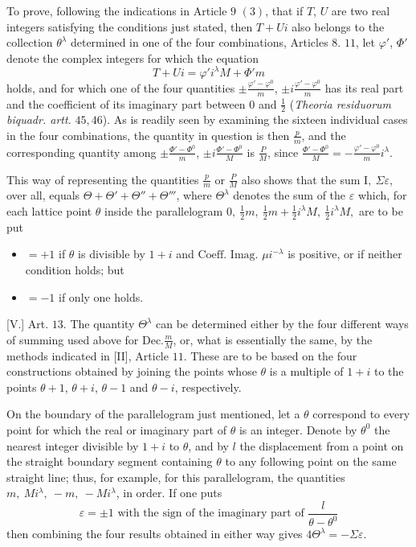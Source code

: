 To prove, following the indications in Article $9$ $(3)$, that if $T$, $U$ are two real integers satisfying the conditions just stated, then $T+Ui$ also belongs to the collection $\theta^\lambda$ determined in one of the four combinations, Articles $8$. $11$, let $\varphi'$, $\Phi'$ denote the complex integers for which the equation
\[
T+Ui=\varphi'i^\lambda M+\Phi'm
\]
holds, and for which one of the four quantities $\pm\frac{\varphi'-\varphi^0}{m}$, $\pm i\frac{\varphi'-\varphi^0}{m}$ has its real part and the coefficient of its imaginary part between $0$ and $\tfrac12$ (\textit{Theoria residuorum biquadr. artt.} $45,46$). As is readily seen by examining the sixteen individual cases in the four combinations, the quantity in question is then $\frac pm$, and the corresponding quantity among $\pm\frac{\Phi'-\Phi^0}{m}$, $\pm i\frac{\Phi'-\Phi^0}{M}$ is $\frac PM$, since $\frac{\Phi'-\Phi^0}{M}=-\frac{\varphi'-\varphi^0}{m}i^\lambda$.

This way of representing the quantities $\frac pm$ or $\frac PM$ also shows that the sum $\mathrm I,\ \Sigma\varepsilon$, over all, equals $\Theta+\Theta'+\Theta''+\Theta'''$, where $\Theta^\lambda$ denotes the sum of the $\varepsilon$ which, for each lattice point $\theta$ inside the parallelogram $0,\ \tfrac12m,\ \tfrac12m+\tfrac12i^\lambda M,\ \tfrac12i^\lambda M,$ are to be put
\begin{itemize}
\item[] $=+1$ if $\theta$ is divisible by $1+i$ and $\text{Coeff. Imag. }\mu i^{-\lambda}$ is positive, or if neither condition holds; but
\item[] $=-1$ if only one holds.
\end{itemize}

[V.] Art. $13$. The quantity $\Theta^\lambda$ can be determined either by the four different ways of summing used above for $\mathrm{Dec.}\frac mM$, or, what is essentially the same, by the methods indicated in [II], Article $11$. These are to be based on the four constructions obtained by joining the points whose $\theta$ is a multiple of $1+i$ to the points $\theta+1$, $\theta+i$, $\theta-1$ and $\theta-i$, respectively.

On the boundary of the parallelogram just mentioned, let a $\theta$ correspond to every point for which the real or imaginary part of $\theta$ is an integer. Denote by $\theta^0$ the nearest integer divisible by $1+i$ to $\theta$, and by $l$ the displacement from a point on the straight boundary segment containing $\theta$ to any following point on the same straight line; thus, for example, for this parallelogram, the quantities $m,\ Mi^\lambda,\ -m,\ -Mi^\lambda$, in order. If one puts
\[
\varepsilon=\pm1\text{ with the sign of the imaginary part of }\frac l{\theta-\theta^0}
\]
then combining the four results obtained in either way gives $4\Theta^\lambda=-\Sigma\varepsilon$.

